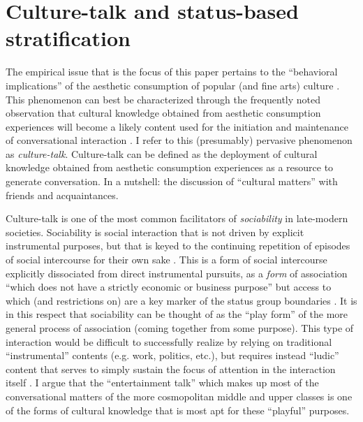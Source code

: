 \doublespacing
\section{Culture-talk and status-based stratification}
The empirical issue that is the focus of this paper pertains to the ``behavioral implications'' of the aesthetic consumption of popular (and fine arts) culture \citep{fine77}.  This phenomenon can best be characterized through the frequently noted observation that cultural knowledge obtained from aesthetic consumption experiences will become a likely content used for the initiation and maintenance of conversational interaction \citep{dimaggio87, collins75}.  I refer to this (presumably) pervasive phenomenon as \emph{culture-talk}.  Culture-talk can be defined as the deployment of cultural knowledge obtained from aesthetic consumption experiences as a resource to generate conversation.  In a nutshell:  the discussion of ``cultural matters'' with friends and acquaintances.  

Culture-talk is one of the most common facilitators of \emph{sociability} in late-modern societies.  Sociability is social interaction that is not driven by explicit instrumental purposes, but that is keyed to the continuing repetition of episodes of social intercourse for their own sake \citep{simmel49}. This is a form of social intercourse explicitly dissociated from direct instrumental pursuits, as a \emph{form} of association ``which does not have a strictly economic or business purpose'' but access to which (and restrictions on) are a key marker of the status group boundaries \citep[114]{weber94}. It is in this respect that sociability can be thought of as the ``play form''  \citep{simmel49} of the more general process of association (coming together from some purpose).  This type of interaction would be difficult to successfully realize by relying on traditional ``instrumental'' contents (e.g. work, politics, etc.), but requires instead ``ludic'' content that serves to simply sustain the focus of attention in the interaction itself \citep{collins04}.  I argue that the ``entertainment talk'' \citep[124-125]{collins75} which makes up most of the conversational matters of the more cosmopolitan middle and upper classes is one of the forms of cultural knowledge that is most apt for these ``playful'' purposes. 

